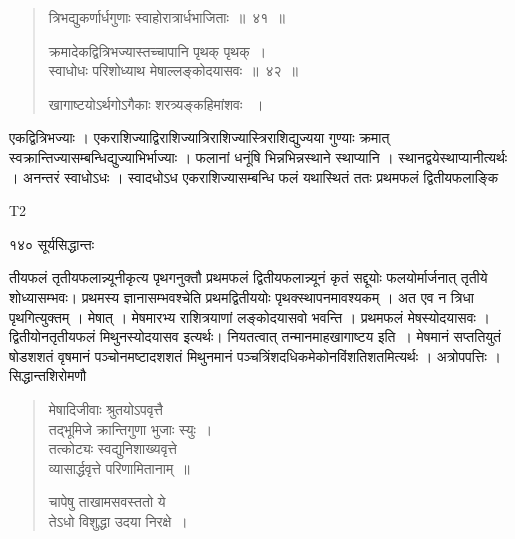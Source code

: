 \documentclass[11pt, openany]{book}
\begin{document}
\begin{quote}
  {\ssi त्रिभद्युकर्णार्धगुणाः स्वाहोरात्रार्धभाजिताः~॥~४१~॥
  
 क्रमादेकद्वित्रिभज्यास्तच्चापानि पृथक् पृथक्~।\\
 स्वाधोधः परिशोध्याथ मेषाल्लङ्कोदयासवः~॥~४२~॥
 
 खागाष्टयोऽर्थगोऽगैकाः शरत्र्यङ्कहिमांशवः ~।}
 \end{quote}

\begin{sloppypar}
एकद्वित्रिभज्याः । एकराशिज्याद्विराशिज्यात्रिराशिज्यास्त्रिराशिद्युज्यया गुण्याः क्रमात् स्वक्रान्तिज्यासम्बन्धिद्युज्याभिर्भाज्याः । फलानां धनूंषि भिन्नभिन्नस्थाने स्थाप्यानि । स्थानद्वयेस्थाप्यानीत्यर्थः । अनन्तरं स्वाधोऽधः । स्वादधोऽध एकराशिज्यासम्बन्धि फलं यथास्थितं ततः प्रथमफलं द्वितीयफलाङ्कि\textendash
\end{sloppypar}

{\tiny{T2}}

\newpage


 \noindent १४० \hspace{4cm} सूर्यसिद्धान्तः
\vspace{1cm}


\begin{sloppypar}
\noindent तीयफलं तृतीयफलान्न्यूनीकृत्य पृथगनुक्तौ प्रथमफलं द्वितीयफलान्न्यूनं कृतं सद्दूयोः फलयोर्मार्जनात् तृतीये शोध्यासम्भवः। प्रथमस्य ज्ञानासम्भवश्चेति प्रथमद्वितीययोः पृथक्स्थापनमावश्यकम् । अत एव न त्रिधा पृथगित्युक्तम् । मेषात् । मेषमारभ्य राशित्रयाणां लङ्कोदयासवो भवन्ति । प्रथमफलं मेषस्योदयासवः । द्वितीयोनतृतीयफलं मिथुनस्योदयासव इत्यर्थः। नियतत्वात् तन्मानमाह\textendash खागाष्टय इति~। मेषमानं सप्ततियुतं षोडशशतं वृषमानं पञ्चोनमष्टादशशतं मिथुनमानं पञ्चत्रिंशदधिकमेकोनविंशतिशतमित्यर्थः । अत्रोपपत्तिः । सिद्धान्तशिरोमणौ\textendash
\end{sloppypar}


\begin{quote}
 {\qt मेषादिजीवाः श्रुतयोऽपवृत्तै\\
तद्भूमिजे क्रान्तिगुणा भुजाः स्युः~।\\
 तत्कोट्यः स्वद्युनिशाख्यवृत्ते\\
व्यासार्द्धवृत्ते परिणामितानाम्~॥

 चापेषु ताखामसवस्ततो ये\\
तेऽधो विशुद्धा उदया निरक्षे~।}
\end{quote}
\end{document}
